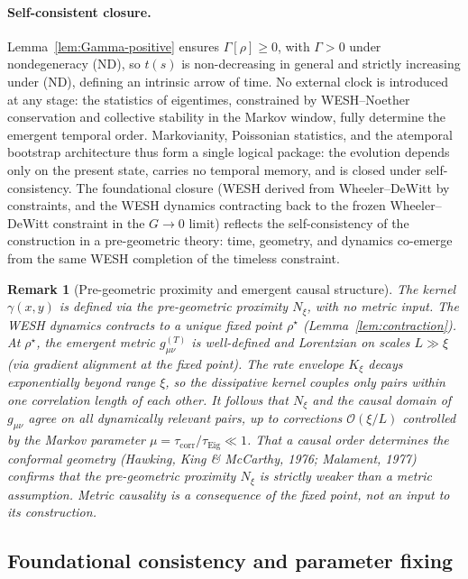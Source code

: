 \documentclass[12pt,a4paper]{article}
\newtheorem{remark}{Remark}[section]
\numberwithin{equation}{section}
\begin{document}
\paragraph{Self-consistent closure.}
Lemma~\ref{lem:Gamma-positive} ensures $\Gamma[\rho]\ge 0$, with $\Gamma>0$ under nondegeneracy (ND), so $t(s)$ is non-decreasing in general and strictly increasing under (ND), defining an intrinsic arrow of time. No external clock is introduced at any stage: the statistics of eigentimes, constrained by WESH--Noether conservation and collective stability in the Markov window, fully determine the emergent temporal order. Markovianity, Poissonian statistics, and the atemporal bootstrap architecture thus form a single logical package: the evolution depends only on the present state, carries no temporal memory, and is closed under self-consistency. The foundational closure (WESH derived from Wheeler--DeWitt by constraints,
and the WESH dynamics contracting back to the frozen Wheeler--DeWitt constraint
in the $G\!\to\!0$ limit) reflects the self-consistency of the construction
in a pre-geometric theory: time, geometry, and dynamics co-emerge from the same
WESH completion of the timeless constraint.

\begin{remark}[Pre-geometric proximity and emergent causal structure]
\label{rem:proximity-causality}
The kernel $\gamma(x,y)$ is defined via the pre-geometric proximity $N_\xi$, with no metric input. The WESH dynamics contracts to a unique fixed point $\rho^\star$ (Lemma~\ref{lem:contraction}). At $\rho^\star$, the emergent metric $g_{\mu\nu}^{(T)}$ is well-defined and Lorentzian on scales $L\gg\xi$ (via gradient alignment at the fixed point). The rate envelope $K_\xi$ decays exponentially beyond range $\xi$, so the dissipative kernel couples only pairs within one correlation length of each other. It follows that $N_\xi$ and the causal domain of $g_{\mu\nu}$ agree on all dynamically relevant pairs, up to corrections $\mathcal{O}(\xi/L)$ controlled by the Markov parameter $\mu = \tau_{\mathrm{corr}}/\tau_{\mathrm{Eig}}\ll 1$. That a causal order determines the conformal geometry (Hawking, King \& McCarthy, 1976; Malament, 1977) confirms that the pre-geometric proximity $N_\xi$ is strictly weaker than a metric assumption. Metric causality is a consequence of the fixed point, not an input to its construction.
\end{remark}

\subsection{Foundational consistency and parameter fixing}
\end{document}
